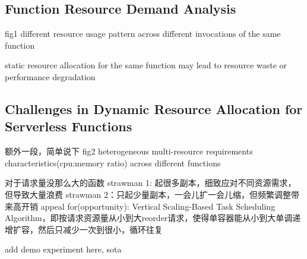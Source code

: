 \subsection{Function Resource Demand Analysis}
\label{sec:background:demand-analysis}


fig1 different resource usage pattern across different invocations of the same function



static resource allocation for the same function may lead to resource waste or performance degradation





\subsection{Challenges in Dynamic Resource Allocation for Serverless Functions}
\label{sec:background:challenges}



额外一段，简单说下 fig2 heterogeneous multi-resource requirements characteristics(cpu:memory ratio) across different functions

对于请求量没那么大的函数
strawman 1: 起很多副本，细致应对不同资源需求，但导致大量浪费
strawman 2：只起少量副本，一会儿扩一会儿缩，但频繁调整带来高开销
appeal for(opportunity): Vertical Scaling-Based Task Scheduling Algorithm，即按请求资源量从小到大reorder请求，使得单容器能从小到大单调递增扩容，然后只减少一次到很小，循环往复


add demo experiment here, sota